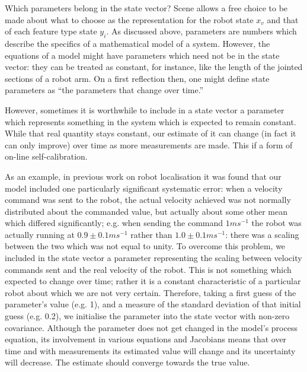 \documentclass{article}
\begin{document}

Which parameters belong in the state vector? Scene allows a free
choice to be made about what to choose as the representation for the
robot state $x_v$ and that of each feature type state $y_i$. As
discussed above, parameters are numbers which describe the specifics
of a mathematical model of a system. However, the equations of a model
might have parameters which need not be in the state vector: they can
be treated as constant, for instance, like the length of the jointed
sections of a robot arm.  On a first reflection then, one might define
state parameters as ``the parameters that change over time.''

However, sometimes it is worthwhile to include in a state vector a
parameter which represents something in the system which is expected
to remain constant. While that real quantity stays constant, our
estimate of it can change (in fact it can only improve) over time as more
measurements are made. This if a form of on-line self-calibration.

As an example, in previous work on robot localisation it was found that our
model included one particularly significant systematic error: when a
velocity command was sent to the robot, the actual velocity achieved
was not normally distributed about the commanded value, but actually
about some other mean which differed significantly; e.g. when
sending the command $1ms^{-1}$ the robot was actually running at $0.9
\pm 0.1 ms^{-1}$ rather than $1.0 \pm 0.1 ms^{-1}$: there was a
scaling between the two which was not equal to unity. To overcome this
problem, we included in the state vector a parameter representing the
scaling between velocity commands sent and the real velocity of the
robot. This is not something which expected to change over time;
rather it is a constant characteristic of a particular robot about
which we are not very certain. Therefore, taking a first guess of the
parameter's value (e.g. 1), and a measure of the standard deviation of
that initial guess (e.g. 0.2), we initialise the parameter into the
state vector with non-zero covariance. Although the parameter does not
get changed in the model's process equation, its involvement in
various equations and Jacobians means that over time and with
measurements its estimated value will change and its uncertainty will
decrease. The estimate should converge towards the true value.
\end{document}
